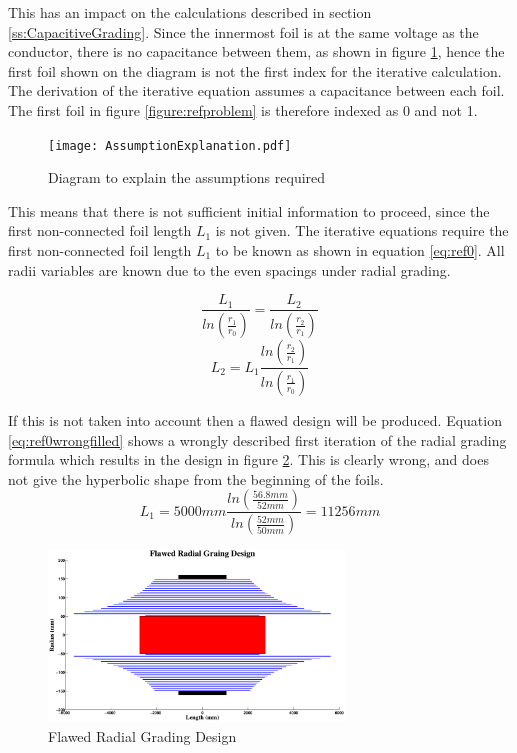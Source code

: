 This has an impact on the calculations described in section \ref{ss:CapacitiveGrading}.
Since the innermost foil is at the same voltage as the conductor, there is no capacitance between them, as shown in figure \ref{figure:required assumptions}, hence the first foil shown on the diagram is not the first index for the iterative calculation.
The derivation of the iterative equation assumes a capacitance between each foil. 
The first foil in figure \ref{figure:refproblem} is therefore indexed as 0 and not 1.

\begin{figure}[!h]
   \centering
   \texttt{[image: AssumptionExplanation.pdf]}
   \caption{Diagram to explain the assumptions required}
   \label{figure:required assumptions}
\end{figure}

This means that there is not sufficient initial information to proceed, since the first non-connected foil length $L_1$ is not given.
The iterative equations require the first non-connected foil length $L_1$ to be known as shown in equation \ref{eq:ref0}. 
All radii variables are known due to the even spacings under radial grading. 

\begin{equation}
   \label{eq:ref0}
   \displaystyle\frac{L_{1}}{ln(\displaystyle\frac{r_{1}}{r_{0}})} = \displaystyle\frac{ L_{2}}{ln(\displaystyle\frac{r_{2}}{r_{1}})} 
\end{equation}
\begin{equation}
   \label{eq:ref0forl1}
   L_{2} = L_{1}\displaystyle\frac{{ln(\displaystyle\frac{r_{2}}{r_{1}})} }{ln(\displaystyle\frac{r_{1}}{r_{0}})}
\end{equation}



If this is not taken into account then a flawed design will be produced.
Equation \ref{eq:ref0wrongfilled} shows a wrongly described first iteration of the radial grading formula which results in the design in figure \ref{figure:flawedgraph}. This is clearly wrong, and does not give the hyperbolic shape from the beginning of the foils.
\begin{equation}
   \label{eq:ref0wrongfilled}
   L_{1} = 5000mm\displaystyle\frac{{ln(\displaystyle\frac{56.8mm}{52mm})} }{ln(\displaystyle\frac{52mm}{50mm})}
   = 11256mm
\end{equation}

\begin{figure}[!h]
   \centering
   \includegraphics[width = 0.7\textwidth]{../Matlab_Calculations/Matlab_David/FlawedRadGradGraph.eps}
   \caption{Flawed Radial Grading Design}
   \label{figure:flawedgraph}
\end{figure}

